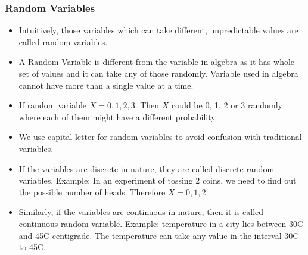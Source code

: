 \begin{frame}\frametitle{Random Variables}
\begin{itemize}

\item Intuitively, those variables which can take different, unpredictable values are called
random variables.
\item A Random Variable is different from the variable in algebra as it has whole set of values and it can take any of those randomly. Variable used in algebra cannot have more than a single value at a time.
\item If random variable $X={0,1,2,3}$. Then $X$ could be 0, 1, 2 or 3 randomly where each of them might have a different probability.
\item We use capital letter for random variables to avoid confusion with traditional variables.
\item If the variables are discrete in nature, they are called discrete random
variables. Example: In an experiment of tossing 2 coins, we need to find out the possible number of heads. Therefore $X= {0, 1, 2}$
\item Similarly, if the variables are continuous in nature, then it is called
continuous random variable. Example: temperature in a city lies between 30C and 45C centigrade. The temperature can take any value in the interval 30C to 45C.
\end{itemize}
\end{frame}

